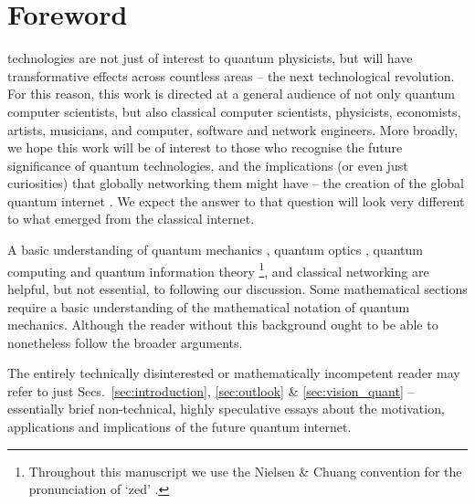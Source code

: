 %
%

\newline \newline
{}
\newline \newline
{}

\section{Foreword}\label{sec:foreword}

 technologies are not just of interest to quantum physicists, but will have transformative effects across countless areas -- the next technological revolution. For this reason, this work is directed at a general audience of not only quantum computer scientists, but also classical computer scientists, physicists, economists, artists, musicians, and computer, software and network engineers. More broadly, we hope this work will be of interest to those who recognise the future significance of quantum technologies, and the implications (or even just curiosities) that globally networking them might have -- the creation of the global quantum internet \cite{bib:Kimble2008}. We expect the answer to that question will look very different to what emerged from the classical internet.

A basic understanding of quantum mechanics \cite{bib:Sakurai94}, quantum optics \cite{bib:GerryKnight05}, quantum computing and quantum information theory \cite{bib:NielsenChuang00}\footnote{Throughout this manuscript we use the Nielsen \& Chuang convention for the pronunciation of `zed' \cite{bib:NielsenChuang00}.}, and classical networking \cite{bib:TanenbaumNet} are helpful, but not essential, to following our discussion. Some mathematical sections require a basic understanding of the mathematical notation of quantum mechanics. Although the reader without this background ought to be able to nonetheless follow the broader arguments.

The entirely technically disinterested or mathematically incompetent reader may refer to just Secs.~\ref{sec:introduction}, \ref{sec:outlook} \& \ref{sec:vision_quant} -- essentially brief non-technical, highly speculative essays about the motivation, applications and implications of the future quantum internet.

